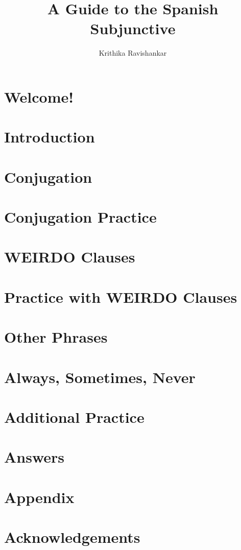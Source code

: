 \documentclass[12pt, oneside]{book}
\title{A Guide to the Spanish Subjunctive}
\author{Krithika Ravishankar}
\begin{document}
\sloppy
\maketitle
\clearpage
\thispagestyle{plain}
\par{}

\tableofcontents
\chapter{Welcome!}



\chapter{Introduction}

\chapter{Conjugation}

\chapter{Conjugation Practice}

\chapter{WEIRDO Clauses}

\chapter{Practice with WEIRDO Clauses}

\chapter{Other Phrases}

\chapter{Always, Sometimes, Never}

\chapter{Additional Practice}

\chapter{Answers}

\chapter{Appendix}
\label{sec:appendix}

\listoftables
\chapter*{Acknowledgements}

\end{document}
